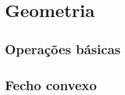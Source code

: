 % 


\section{Geometria}

% 

% 

% 

\subsection{Operações básicas}


% 

% 

\subsection{Fecho convexo}



